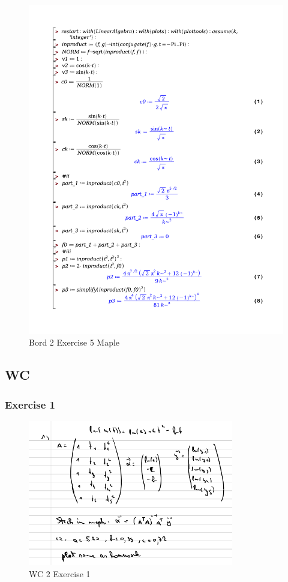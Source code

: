 \documentclass[a4paper]{report}
\begin{document}
\begin{figure}[H]
	\centering
	\includegraphics[width=\textwidth]{exercises/bord_2_ex_5.pdf}
	\caption{Bord 2 Exercise 5 Maple}
	\label{fig:bord_2_ex_5_maple}
\end{figure}

\subsection{WC}

\subsubsection{Exercise 1}

\begin{figure}[H]
	\centering
	\includegraphics[width=0.8\textwidth]{images/wc_2_ex_1.png}
	\caption{WC 2 Exercise 1}
	\label{fig:wc_2_ex_1}
\end{figure}
\end{document}
